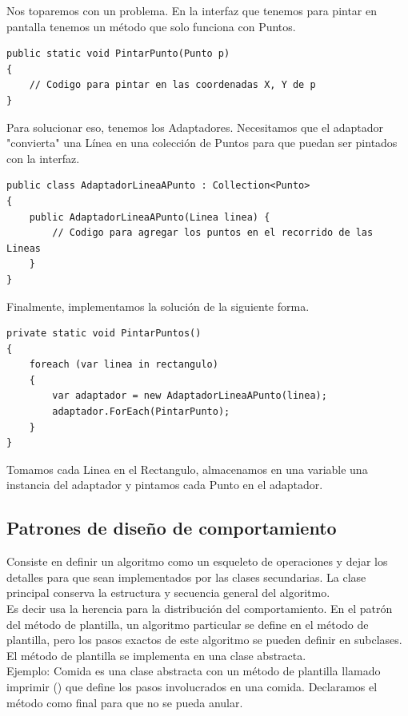 \documentclass[twoside,twocolumn]{article}
\begin{document}
Nos toparemos con un problema. En la interfaz que tenemos para pintar en pantalla tenemos un método que solo funciona con Puntos.
\lstset{style=sharpc}
\begin{lstlisting}
public static void PintarPunto(Punto p)
{
    // Codigo para pintar en las coordenadas X, Y de p
}
\end{lstlisting}

Para solucionar eso, tenemos los Adaptadores. Necesitamos que el adaptador "convierta" una Línea en una colección de Puntos para que puedan ser pintados con la interfaz.
\lstset{style=sharpc}
\begin{lstlisting}
public class AdaptadorLineaAPunto : Collection<Punto>
{
    public AdaptadorLineaAPunto(Linea linea) {
        // Codigo para agregar los puntos en el recorrido de las Lineas
    }
}
\end{lstlisting}

Finalmente, implementamos la solución de la siguiente forma.
\lstset{style=sharpc}
\begin{lstlisting}
private static void PintarPuntos()
{
    foreach (var linea in rectangulo)
    {
        var adaptador = new AdaptadorLineaAPunto(linea);
        adaptador.ForEach(PintarPunto);
    }  
}
\end{lstlisting}

Tomamos cada Linea en el Rectangulo, almacenamos en una variable una instancia del adaptador y pintamos cada Punto en el adaptador.


\subsection{Patrones de diseño de comportamiento}
Consiste en definir un algoritmo como un esqueleto de operaciones y dejar los detalles para que sean implementados por las clases secundarias. La clase principal conserva la estructura y secuencia general del algoritmo.\\

Es decir usa la herencia para la distribución del comportamiento. En el patrón del método de plantilla,  un algoritmo particular se define en el método de plantilla, pero los pasos exactos de este algoritmo se pueden definir en subclases. El método de plantilla se implementa en una clase abstracta.\\

Ejemplo: Comida es una clase abstracta con un método de plantilla llamado imprimir () que define los pasos involucrados en una comida. Declaramos el método como final para que no se pueda anular.\\ 
\end{document}
